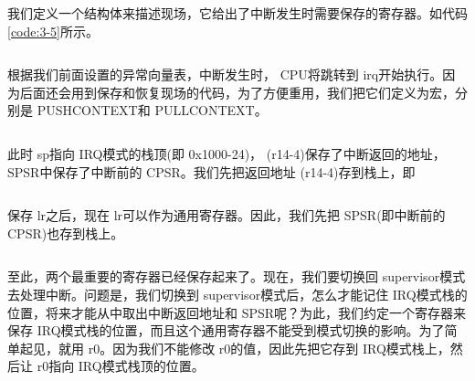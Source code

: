 \documentclass[main.tex]{subfiles}
\begin{document}
\begin{CJK*}{UTF8}{song}
\par
我们定义一个结构体来描述现场，它给出了中断发生时需要保存的寄存器。如代码\ref{code:3-5}所示。

\begin{code}
\label{code:3-5}
\inputminted[firstline=25,lastline=45,linenos,numbersep=5pt,frame=lines,framesep=2mm]{c}{src/chapter03/kernel/machdep.h}
\end{code}

根据我们前面设置的异常向量表，中断发生时， CPU将跳转到 irq开始执行。因为后面还会用到保存和恢复现场的代码，为了方便重用，我们把它们定义为宏，分别是 PUSH\-CONTEXT和 PULL\-CONTEXT。

\begin{code}
\label{code:3-6}
\inputminted[firstline=147,lastline=153,linenos,numbersep=5pt,frame=lines,framesep=2mm]{gas}{src/chapter03/kernel/entry.S}
\end{code}

此时 sp指向 IRQ模式的栈顶(即 0x1000-24)， (r14-4)保存了中断返回的地址， SPSR中保存了中断前的 CPSR。我们先把返回地址 (r14-4)存到栈上，即

\begin{code}
\label{code:3-7}
\inputminted[firstline=40,lastline=43,linenos,numbersep=5pt,frame=lines,framesep=2mm]{gas}{src/chapter03/kernel/entry.S}
\end{code}

保存 lr之后，现在 lr可以作为通用寄存器。因此，我们先把 SPSR(即中断前的 CPSR)也存到栈上。
\begin{code}
\label{code:3-8}
\inputminted[firstline=44,lastline=45,linenos,numbersep=5pt,frame=lines,framesep=2mm]{gas}{src/chapter03/kernel/entry.S}
\end{code}

至此，两个最重要的寄存器已经保存起来了。现在，我们要切换回 supervisor模式去处理中断。问题是，我们切换到 supervisor模式后，怎么才能记住 IRQ模式栈的位置，将来才能从中取出中断返回地址和 SPSR呢？为此，我们约定一个寄存器来保存 IRQ模式栈的位置，而且这个通用寄存器不能受到模式切换的影响。为了简单起见，就用 r0。因为我们不能修改 r0的值，因此先把它存到 IRQ模式栈上，然后让 r0指向 IRQ模式栈顶的位置。

\begin{code}
\label{code:3-9}
\inputminted[firstline=46,lastline=48,linenos,numbersep=5pt,frame=lines,framesep=2mm]{gas}{src/chapter03/kernel/entry.S}
\end{code}


\end{CJK*}
\end{document}
